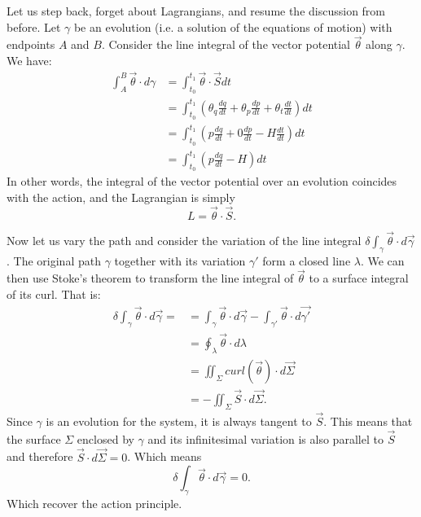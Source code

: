 \documentclass[10pt,twocolumn, nofootinbib]{revtex4-2}
\begin{document}
Let us step back, forget about Lagrangians, and resume the discussion from before. Let $\gamma$ be an evolution (i.e. a solution of the equations of motion) with endpoints $A$ and $B$. Consider the line integral of the vector potential $\vec{\theta}$ along $\gamma$. We have:
\begin{equation}
\begin{aligned}
	\int_A^B \vec{\theta} \cdot d\gamma &= \int^{t_1}_{t_0} \vec{\theta} \cdot \vec{S} dt \\
	&= \int^{t_1}_{t_0} \left(\theta_q \frac{dq}{dt} + \theta_p \frac{dp}{dt} + \theta_t \frac{dt}{dt}\right) dt \\
	&= \int^{t_1}_{t_0} \left(p \frac{dq}{dt} + 0 \frac{dp}{dt} - H \frac{dt}{dt}\right) dt \\
	&= \int^{t_1}_{t_0} \left(p \frac{dq}{dt} - H\right) dt
\end{aligned}
\end{equation}
In other words, the integral of the vector potential over an evolution coincides with the action, and the Lagrangian is simply
\begin{equation}
	L = \vec{\theta} \cdot \vec{S}.
\end{equation}

Now let us vary the path and consider the variation of the line integral $\delta \int_{\gamma} \vec{\theta} \cdot d\vec{\gamma}$. The original path $\gamma$ together with its variation $\gamma'$ form a closed line $\lambda$. We can then use Stoke's theorem to transform the line integral of $\vec{\theta}$ to a surface integral of its curl. That is:
\begin{align*}
	\delta \int_{\gamma} \vec{\theta} \cdot d\vec{\gamma} = 
	&= \int_{\gamma} \vec{\theta} \cdot d\vec{\gamma} - \int_{\gamma'} \vec{\theta} \cdot d\vec{\gamma'} \\
	&= \oint_{\lambda} \vec{\theta}  \cdot d\lambda \\
	&= \iint_{\Sigma} curl(\vec{\theta}) \cdot d\vec{\Sigma} \\
	&= - \iint_{\Sigma} \vec{S} \cdot d\vec{\Sigma}.
\end{align*}
Since $\gamma$ is an evolution for the system, it is always tangent to $\vec{S}$. This means that the surface $\Sigma$ enclosed by $\gamma$ and its infinitesimal variation is also parallel to $\vec{S}$ and therefore $\vec{S} \cdot d\vec{\Sigma} = 0$. Which means
\begin{equation}
	\delta \int_{\gamma} \vec{\theta} \cdot d\vec{\gamma} = 0.
\end{equation}
Which recover the action principle.
\end{document}

